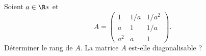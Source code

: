 \begin{enonce}
\begin{exercise}[ID={RMS 122-2 E1314 CCP PC},subtitle={},tags={}]
Soient $a\in\R*$ et 
\begin{equation*}
A=
\begin{pmatrix}
1   & 1/a & 1/a^2\\
a   & 1   & 1/a\\
a^2 & a   & 1
\end{pmatrix}.
\end{equation*}
Déterminer le rang de $A$.
La matrice $A$ est-elle diagonalisable ?
\end{exercise}
\begin{solution}
\end{solution}
\end{enonce}
